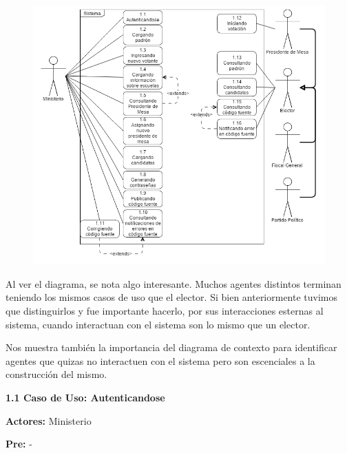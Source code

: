 \begin{figure}[h!]
\centering
\includegraphics[scale=0.45]{imagenes/CU/casosdeusopreparacion}
\end{figure}



Al ver el diagrama, se nota algo interesante. Muchos agentes distintos terminan teniendo los mismos casos de uso que el elector. Si bien anteriormente tuvimos que distinguirlos y fue importante hacerlo, por sus interacciones esternas al sistema, cuando interactuan con el sistema son lo mismo que un elector.

Nos muestra también la importancia del diagrama de contexto para identificar agentes que quizas no interactuen con el sistema pero son escenciales a la construcción del mismo.

\newpage

\textbf{1.1 Caso de Uso: Autenticandose}

\textbf{Actores:} Ministerio

\textbf{Pre:} -

